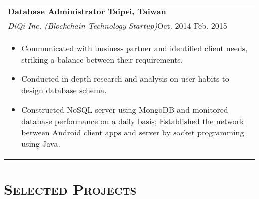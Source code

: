 \documentclass[a4paper,11pt]{article} %
\begin{document}
{\begin{tabular}{p{18.5cm}}
%
{\bf{Database Administrator}} \hfill \bf{Taipei, Taiwan}\\ 
{\it DiQi Inc. (Blockchain Technology Startup)}\hfill  Oct. 2014-Feb. 2015  \\%
\begin{itemize}
\vspace{-3mm}
\item Communicated with business partner and identified client needs, striking a balance between their requirements. 
\item Conducted in-depth research and analysis on user habits to design database schema.
\item Constructed NoSQL server using MongoDB and monitored database performance on a daily basis; Established the network between Android client apps and server by socket programming using Java. \vspace*{-\baselineskip}
\end{itemize}\\
\end{tabular}


\section{\Large\bf\textsc{Selected Projects}}
\begin{tabular}{p{18.5cm}}


\end{tabular}}
\end{document}
